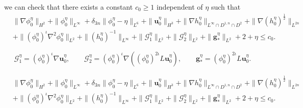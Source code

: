 \documentclass[10pt,a4paper]{amsart}
\begin{document}
we can check that there exists a constant $c_0\geq 1$ independent of $\eta$ such that
\begin{equation}\label{2.14}
\begin{aligned}
&\|\nabla\phi^\eta_0\|_{H^2}+\|\phi^\eta_0\|_{ L^\infty}+\delta_{3n}\|\phi^\eta_0-\eta\|_{ L^6}+\|\boldsymbol{u}^\eta_0\|_{H^3}+\|\nabla h^\eta_0\|_{L^\infty\cap D^{1,n}\cap D^2}+\|\nabla (h^\eta_0)^{\frac{1}{2}}\|_{L^{2n}}
\\
&+\|(\phi^\eta_0)^\iota\nabla^2\phi^\eta_0\|_{L^2}+\|(h^\eta_0)^{-1}\|_{L^\infty}+\|\mathcal{G}^\eta_1\|_{L^2}+\|\mathcal{G}^\eta_2\|_{L^2}+\|\boldsymbol{g}^\eta_*\|_{L^2}+2+\eta\leq c_0.
\end{aligned}
\end{equation}

\begin{equation}
\mathcal{G}^\eta_1=(\phi^\eta_0)^{\iota}\nabla \boldsymbol{u}^\eta_0,\qquad \mathcal{G}^\eta_2=(\phi^\eta_0)^{\iota}\nabla((\phi^\eta_0)^{2\iota}L\boldsymbol{u}^\eta_0),\qquad 
\boldsymbol{g}^\eta_*=(\phi^\eta_0)^{2\iota}L\boldsymbol{u}^\eta_0.
\end{equation}

\begin{equation}
\begin{aligned}
&\|\nabla\phi^\eta_0\|_{H^2}+\|\phi^\eta_0\|_{ L^\infty}+\delta_{3n}\|\phi^\eta_0-\eta\|_{ L^6}+\|\boldsymbol{u}^\eta_0\|_{H^3}+\|\nabla h^\eta_0\|_{L^\infty\cap D^{1,n}\cap D^2}+\|\nabla (h^\eta_0)^{\frac{1}{2}}\|_{L^{2n}}
\\
&+\|(\phi^\eta_0)^\iota\nabla^2\phi^\eta_0\|_{L^2}+\|(h^\eta_0)^{-1}\|_{L^\infty}+\|\mathcal{G}^\eta_1\|_{L^2}+\|\mathcal{G}^\eta_2\|_{L^2}+\|\boldsymbol{g}^\eta_*\|_{L^2}+2+\eta\leq c_0.
\end{aligned}
\end{equation}
\end{document}
